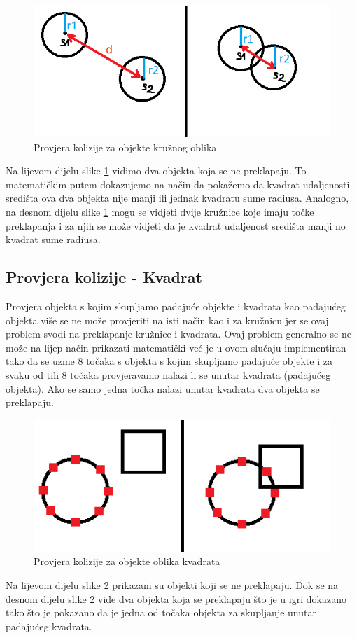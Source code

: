 \documentclass[times, utf8, zavrsni, numeric]{fer}
\begin{document}
		\begin{figure}[H]
			\includegraphics[scale=0.6]{"slike/circlekolizija.png"} 
			\centering
			\caption{Provjera kolizije za objekte kružnog oblika}
			\label{fig:kolizijacircle}
		\end{figure}
	
	Na lijevom dijelu slike \ref{fig:kolizijacircle} vidimo dva objekta koja se ne preklapaju. To matematičkim putem dokazujemo na način da pokažemo da kvadrat udaljenosti središta ova dva objekta nije manji ili jednak kvadratu sume radiusa. Analogno, na desnom dijelu slike \ref{fig:kolizijacircle}
	mogu se vidjeti dvije kružnice koje imaju točke preklapanja i za njih se može vidjeti da je kvadrat udaljenost središta manji no kvadrat sume radiusa. 
	
	\subsection{Provjera kolizije - Kvadrat}
	Provjera objekta s kojim skupljamo padajuće objekte i kvadrata kao padajućeg objekta više se ne može provjeriti na isti način kao i za kružnicu jer se ovaj problem svodi na preklapanje kružnice i kvadrata.
	Ovaj problem generalno se ne može na lijep način prikazati matematički već je u ovom slučaju implementiran tako da se uzme 8 točaka s objekta s kojim skupljamo padajuće objekte i za svaku od tih 8 točaka provjeravamo nalazi li se unutar 
	kvadrata (padajućeg objekta). Ako se samo jedna točka nalazi unutar kvadrata dva objekta se preklapaju. 
	
		\begin{figure}[H]
			\includegraphics[scale=0.6]{"slike/squarekolizija.png"} 
			\centering
			\caption{Provjera kolizije za objekte oblika kvadrata}
			\label{fig:kolizijasquare}
		\end{figure}
		Na lijevom dijelu slike \ref{fig:kolizijasquare} prikazani su objekti koji se ne preklapaju. Dok se na desnom dijelu slike \ref{fig:kolizijasquare} vide dva objekta koja se preklapaju što je u igri dokazano tako što je pokazano da je jedna od točaka objekta za skupljanje unutar padajućeg kvadrata.
	
\end{document}
